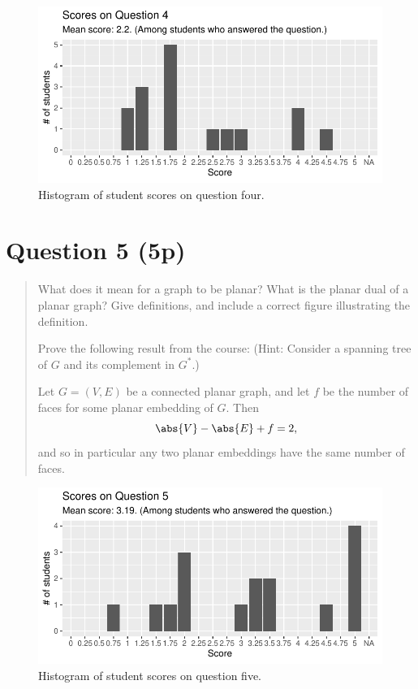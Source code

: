 \documentclass[nobib]{tufte-handout}
\begin{document}
\begin{figure}
  \centering
  \includegraphics[width = \textwidth]{Q4.pdf}
  \caption[Score histogram for Q4]{Histogram of student scores on question four.}
  \label{fig:Q4}
\end{figure}

\section{Question 5 (5p)} %

\begin{quotation}
  What does it mean for a graph to be planar? What is the planar dual of a planar graph? Give definitions, and include a correct figure illustrating the definition.

  Prove the following result from the course: (Hint: Consider a spanning tree of $G$ and its complement in $G^*$.)
  \begin{theorem}
    Let $G = (V,E)$ be a connected planar graph, and let $f$ be the number of faces for some planar embedding of $G$. Then
    $$\abs{V} - \abs{E} + f = 2,$$
    and so in particular any two planar embeddings have the same number of faces.
  \end{theorem}
\end{quotation}

\begin{figure}
  \centering
  \includegraphics[width = \textwidth]{Q5.pdf}
  \caption[Score histogram for Q5]{Histogram of student scores on question five.}
  \label{fig:Q5}
\end{figure}
\end{document}
